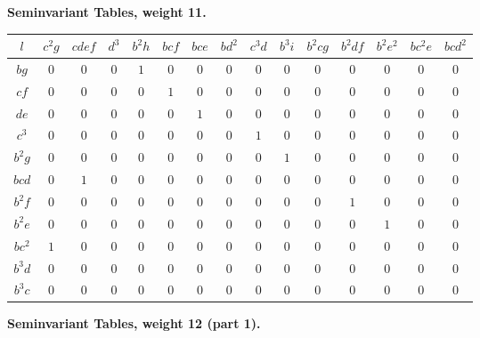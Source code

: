 \documentclass[11pt,a4paper]{book}
\begin{document}
{{{\newpage
\textbf{Seminvariant Tables, weight 11.}

\begin{longtable}{|c|c|c|c|c|c|c|c|c|c|c|c|c|c|c|}
\hline
$l$ & $c^2g$ & $cdef$ & $d^3$ & $b^2h$ & $bcf$ & $bce$ & $bd^2$ & $c^3d$ & $b^3i$ & $b^2cg$ & $b^2df$ & $b^2e^2$ & $bc^2e$ & $bcd^2$\\
\hline
\endhead
$bg$ & $0$ & $0$ & $0$ & $1$ & $0$ & $0$ & $0$ & $0$ & $0$ & $0$ & $0$ & $0$ & $0$ & $0$\\
$cf$ & $0$ & $0$ & $0$ & $0$ & $1$ & $0$ & $0$ & $0$ & $0$ & $0$ & $0$ & $0$ & $0$ & $0$\\
$de$ & $0$ & $0$ & $0$ & $0$ & $0$ & $1$ & $0$ & $0$ & $0$ & $0$ & $0$ & $0$ & $0$ & $0$\\
$c^3$ & $0$ & $0$ & $0$ & $0$ & $0$ & $0$ & $0$ & $1$ & $0$ & $0$ & $0$ & $0$ & $0$ & $0$\\
$b^2g$ & $0$ & $0$ & $0$ & $0$ & $0$ & $0$ & $0$ & $0$ & $1$ & $0$ & $0$ & $0$ & $0$ & $0$\\
$bcd$ & $0$ & $1$ & $0$ & $0$ & $0$ & $0$ & $0$ & $0$ & $0$ & $0$ & $0$ & $0$ & $0$ & $0$\\
$b^2f$ & $0$ & $0$ & $0$ & $0$ & $0$ & $0$ & $0$ & $0$ & $0$ & $0$ & $1$ & $0$ & $0$ & $0$\\
$b^2e$ & $0$ & $0$ & $0$ & $0$ & $0$ & $0$ & $0$ & $0$ & $0$ & $0$ & $0$ & $1$ & $0$ & $0$\\
$bc^2$ & $1$ & $0$ & $0$ & $0$ & $0$ & $0$ & $0$ & $0$ & $0$ & $0$ & $0$ & $0$ & $0$ & $0$\\
$b^3d$ & $0$ & $0$ & $0$ & $0$ & $0$ & $0$ & $0$ & $0$ & $0$ & $0$ & $0$ & $0$ & $0$ & $0$\\
$b^3c$ & $0$ & $0$ & $0$ & $0$ & $0$ & $0$ & $0$ & $0$ & $0$ & $0$ & $0$ & $0$ & $0$ & $0$\\
\hline
\end{longtable}

\newpage
\textbf{Seminvariant Tables, weight 12 (part 1).}

}}}
\end{document}
